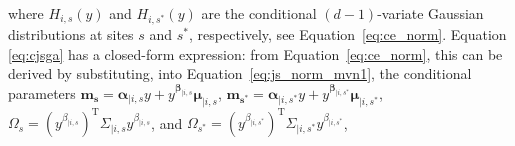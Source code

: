 \documentclass[12pt]{article}
\newcommand{\JSGa}{\mathop{\mathrm{JS}^{\mathrm{G}_{\lambda}}}\nolimits}
\newcommand{\cJSGa}[1]{\mathop{\mathrm{cJS}_{i, #1}^{\mathrm{G}_{\lambda}}}\nolimits}
\newcommand\numberthis{\addtocounter{equation}{1}\tag{\theequation}}
\newcommand{\mvmean}[1]{\symbf{\alpha}_{\mid i, #1} y + y^{\symbf{\beta}_{\mid i, #1}} \symbf{\mu}_{\mid i, #1}}
\newcommand{\mvcov}[1]{\left(y^{\beta_{\mid i, #1}}\right)^{\mathrm{T}} \Sigma_{\mid i, #1} y^{\beta_{\mid i, #1}}}
\begin{document}
where $H_{i, s}(y)$ and $H_{i, s^*}(y)$ are the conditional $(d-1)$-variate Gaussian distributions at sites $s$ and $s^*$, respectively, see Equation~\eqref{eq:ce_norm}.
Equation \eqref{eq:cjsga} has a closed-form expression: from Equation~\eqref{eq:ce_norm}, this can be derived by substituting, into Equation~\eqref{eq:js_norm_mvn1}, the conditional parameters $\symbf{m_s} = \mvmean{s}$, $\symbf{m_{s^*}} = \mvmean{s^*}$,  $\Omega_s = \mvcov{s}$, and $\Omega_{s^*} = \mvcov{s^*}$, 
\end{document}
